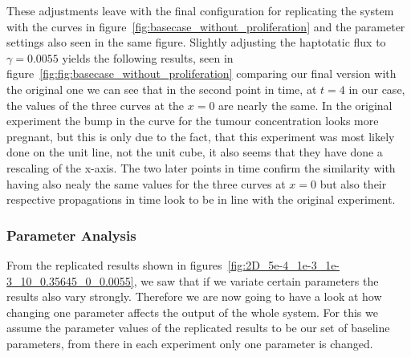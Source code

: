 These adjustments leave with the final configuration for replicating the system with the curves in figure~\ref{fig:basecase_without_proliferation} and the parameter settings also seen in the same figure.
Slightly adjusting the haptotatic flux to $\gamma=0.0055$ yields the following results, seen in figure~\ref{fig:fig:basecase_without_proliferation} comparing our final version with the original one we can see that in the second point in time, at $t=4$ in our case, the values of the three curves at the $x=0$ are nearly the same. In the original experiment the bump in the curve for the tumour concentration looks more pregnant, but this is only due to the fact, that this experiment was most likely done on the unit line, not the unit cube, it also seems that they have done a rescaling of the x-axis. The two later points in time confirm the similarity with having also nealy the same values for the three curves at $x=0$ but also their respective propagations in time look to be in line with the original experiment. 



\subsubsection{Parameter Analysis}
From the replicated results shown in figures~\ref{fig:2D_5e-4_1e-3_1e-3_10_0.35645_0_0.0055}, we saw that if we variate certain parameters the results also vary strongly. Therefore we are now going to have a look at how changing one parameter affects the output of the whole system. For this we assume the parameter values of the replicated results to be our set of baseline parameters, from there in each experiment only one parameter is changed. 
